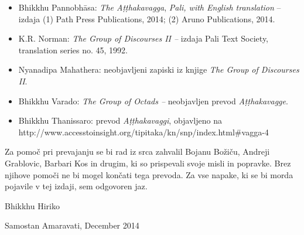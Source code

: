 \begin{itemize}
\item
  Bhikkhu Pannobhāsa: \emph{The Aṭṭhakavagga}, \emph{Pali, with English
  translation} -- izdaja (1) Path Press Publications, 2014; (2) Aruno
  Publications, 2014.
\item
  K.R. Norman: \emph{The Group of Discourses II --} izdaja Pali Text
  Society, translation series no. 45, 1992.
\item
  Nyanadipa Mahathera: neobjavljeni zapiski iz knjige \emph{The Group of
  Discourses II}.
\item
  Bhikkhu Varado: \emph{The Group of Octads --} neobjavljen prevod
  \emph{Aṭṭhakavagge}.
\item
  Bhikkhu Thanissaro: prevod \emph{Aṭṭhakavaggi}, objavljeno na
  http://www.accesstoinsight.org/tipitaka/kn/snp/index.html\#vagga-4
\end{itemize}

Za pomoč pri prevajanju se bi rad iz srca zahvalil Bojanu Božiču,
Andreji Grablovic, Barbari Kos in drugim, ki so prispevali svoje misli
in popravke. Brez njihove pomoči ne bi mogel končati tega prevoda. Za
vse napake, ki se bi morda pojavile v tej izdaji, sem odgovoren jaz.

Bhikkhu Hiriko

Samostan Amaravati, December 2014

